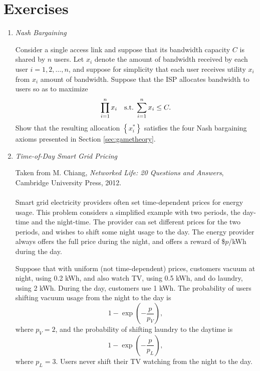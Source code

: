 \section{Exercises}

\begin{enumerate}
\item \emph{Nash Bargaining}

Consider a single access link and suppose that its bandwidth capacity $C$ is shared by $n$ users. Let $x_i$ denote the amount of bandwidth received by each user $i = 1,2,\ldots,n$, and suppose for simplicity that each user receives utility $x_i$ from $x_i$ amount of bandwidth. Suppose that the ISP allocates bandwidth to users so as to maximize
\begin{equation}
\prod_{i = 1}^n x_i\quad{\rm s.t.}\;\sum_{i = 1}^n x_i \leq C.
\end{equation}
Show that the resulting allocation $\left\{x_i^\ast\right\}$ satisfies the four Nash bargaining axioms presented in Section \ref{sec:gametheory}.

\item \emph{Time-of-Day Smart Grid Pricing}

Taken from M. Chiang, \emph{Networked Life: 20 Questions and Answers}, Cambridge University Press, 2012.
\\ \\
Smart grid electricity providers often set time-dependent prices for energy usage.  This problem considers a simplified example with two periods, the day-time and the night-time.  The provider can set different prices for the two periods, and wishes to shift some night usage to the day.  The energy provider always offers the full price during the night, and offers a reward of \$$p$/kWh during the day.

Suppose that with uniform (not time-dependent) prices, customers vacuum at night, using 0.2 kWh, and also watch TV, using 0.5 kWh, and do laundry, using 2 kWh.  During the day, customers use 1 kWh.  The probability of users shifting vacuum usage from the night to the day is
\begin{equation}
1 - \exp\left(-\frac{p}{p_V}\right),
\end{equation}
where $p_V = 2$, and the probability of shifting laundry to the daytime is
\begin{equation}
1 - \exp\left(-\frac{p}{p_L}\right),
\end{equation}
where $p_L = 3$.  Users never shift their TV watching from the night to the day.


\end{enumerate}
